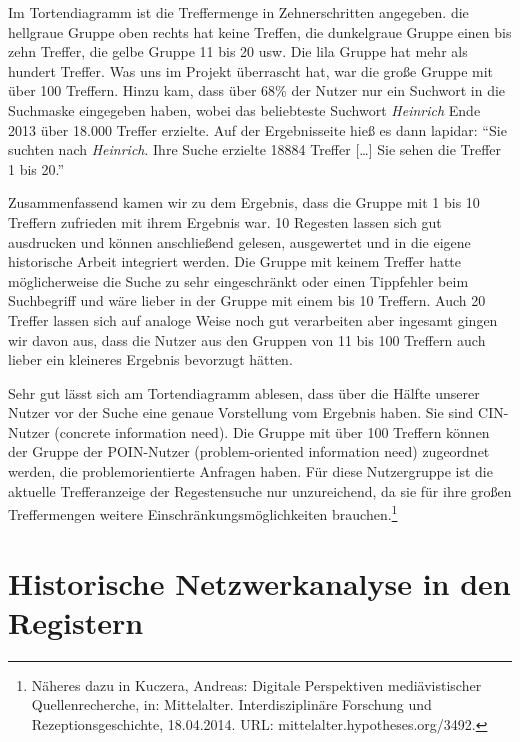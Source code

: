 \documentclass[ngerman,]{scrreprt}
\begin{document}
Im Tortendiagramm ist die Treffermenge in Zehnerschritten angegeben. die hellgraue Gruppe oben rechts hat keine Treffen, die dunkelgraue Gruppe einen bis zehn Treffer, die gelbe Gruppe 11 bis 20 usw. Die lila Gruppe hat mehr als hundert Treffer. Was uns im Projekt überrascht hat, war die große Gruppe mit über 100 Treffern. Hinzu kam, dass über 68\% der Nutzer nur ein Suchwort in die Suchmaske eingegeben haben, wobei das beliebteste Suchwort \emph{Heinrich} Ende 2013 über 18.000 Treffer erzielte. Auf der Ergebnisseite hieß es dann lapidar: ``Sie suchten nach \emph{Heinrich}. Ihre Suche erzielte 18884 Treffer {[}\ldots{}{]} Sie sehen die Treffer 1 bis 20.''

Zusammenfassend kamen wir zu dem Ergebnis, dass die Gruppe mit 1 bis 10 Treffern zufrieden mit ihrem Ergebnis war. 10 Regesten lassen sich gut ausdrucken und können anschließend gelesen, ausgewertet und in die eigene historische Arbeit integriert werden. Die Gruppe mit keinem Treffer hatte möglicherweise die Suche zu sehr eingeschränkt oder einen Tippfehler beim Suchbegriff und wäre lieber in der Gruppe mit einem bis 10 Treffern. Auch 20 Treffer lassen sich auf analoge Weise noch gut verarbeiten aber ingesamt gingen wir davon aus, dass die Nutzer aus den Gruppen von 11 bis 100 Treffern auch lieber ein kleineres Ergebnis bevorzugt hätten.

Sehr gut lässt sich am Tortendiagramm ablesen, dass über die Hälfte unserer Nutzer vor der Suche eine genaue Vorstellung vom Ergebnis haben. Sie sind CIN-Nutzer (concrete information need). Die Gruppe mit über 100 Treffern können der Gruppe der POIN-Nutzer (problem-oriented information need) zugeordnet werden, die problemorientierte Anfragen haben. Für diese Nutzergruppe ist die aktuelle Trefferanzeige der Regestensuche nur unzureichend, da sie für ihre großen Treffermengen weitere Einschränkungsmöglichkeiten brauchen.\footnote{Näheres dazu in Kuczera, Andreas: Digitale Perspektiven mediävistischer Quellenrecherche, in: Mittelalter. Interdisziplinäre Forschung und Rezeptionsgeschichte, 18.04.2014. URL: mittelalter.hypotheses.org/3492.}

\section{Historische Netzwerkanalyse in den Registern}\label{historische-netzwerkanalyse-in-den-registern}
\end{document}
